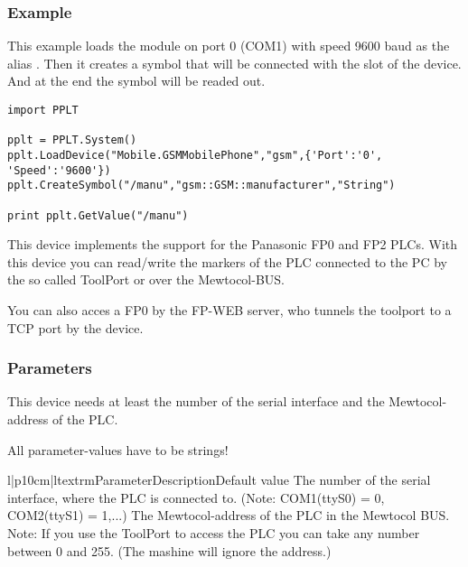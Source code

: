 \subsubsection{Example}
This example loads the  module on port 0 (COM1) with 
speed 9600 baud as the alias . Then it creates a symbol 
 that will be connected with the  slot of the 
device. And at the end the symbol will be readed out.
\begin{verbatim}
import PPLT

pplt = PPLT.System()
pplt.LoadDevice("Mobile.GSMMobilePhone","gsm",{'Port':'0', 'Speed':'9600'})
pplt.CreateSymbol("/manu","gsm::GSM::manufacturer","String")

print pplt.GetValue("/manu")
\end{verbatim}






This device implements the support for the Panasonic FP0 and FP2 PLCs. With 
this device you can read/write the markers of the PLC connected to the PC by 
the so called ToolPort or over the Mewtocol-BUS. 

You can also acces a FP0 by the FP-WEB server, who tunnels the toolport to a 
TCP port by the  device. 

\subsubsection{Parameters}
This device needs at least the number of the serial interface and
the Mewtocol-address of the PLC.
\begin{notice}
All parameter-values have to be strings!
\end{notice}

\begin{tableiii}{l|p{10cm}|l}{textrm}{Parameter}{Description}{Default value}
        {The number of the serial interface, where the PLC is connected to. 
        (Note: COM1(ttyS0) = 0, COM2(ttyS1) = 1,...)}
        {}
        {The Mewtocol-address of the PLC in the Mewtocol BUS. Note: If you use
        the ToolPort to access the PLC you can take any number between 0 and
        255. (The mashine will ignore the address.)}
        {}
\end{tableiii}

